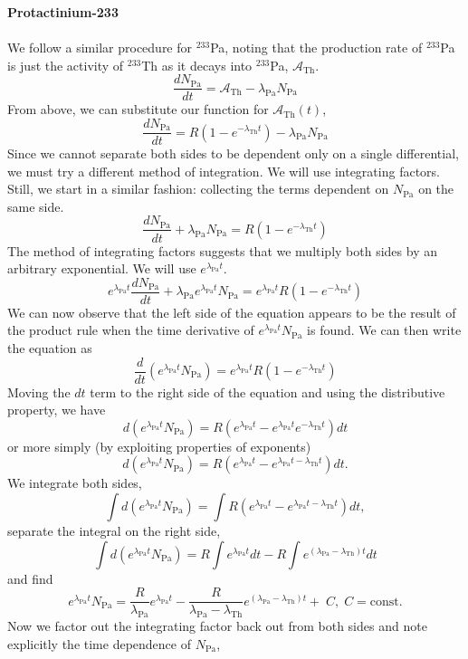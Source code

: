 \documentclass{report}
\begin{document}
\begin{enumerate}[a)]
\textbf{Protactinium-233}\\
\-\\
We follow a similar procedure for $^{233}$Pa, noting that the production rate of $^{233}$Pa is just the activity of $^{233}$Th as it decays into $^{233}$Pa, $\mathcal{A}_{\text{Th}}$.
$$\frac{dN_{\text{Pa}}}{dt} = \mathcal{A}_{\text{Th}} - \lambda_{\text{Pa}}N_{\text{Pa}}$$
From above, we can substitute our function for $\mathcal{A}_{\text{Th}}(t)$,
$$\frac{dN_{\text{Pa}}}{dt} = R(1-e^{-\lambda_{\text{Th}}t}) - \lambda_{\text{Pa}}N_{\text{Pa}}$$
Since we cannot separate both sides to be dependent only on a single differential, we must try a different method of integration. We will use integrating factors. Still, we start in a similar fashion: collecting the terms dependent on $N_{\text{Pa}}$ on the same side.
$$ \frac{dN_{\text{Pa}}}{dt}+\lambda_{\text{Pa}}N_{\text{Pa}} = R(1-e^{-\lambda_{\text{Th}}t}) $$
The method of integrating factors suggests that we multiply both sides by an arbitrary exponential. We will use $e^{\lambda_{\text{Pa}}t}$.
$$ e^{\lambda_{\text{Pa}}t}\frac{dN_{\text{Pa}}}{dt} + \lambda_{\text{Pa}}e^{\lambda_{\text{Pa}}t}N_{\text{Pa}} = e^{\lambda_{\text{Pa}}t}R(1-e^{-\lambda_{\text{Th}}t}) $$
We can now observe that the left side of the equation appears to be the result of the product rule when the time derivative of $e^{\lambda_{\text{Pa}}t}N_{\text{Pa}}$ is found. We can then write the equation as
$$\frac{d}{dt}(e^{\lambda_{\text{Pa}}t}N_{\text{Pa}}) = e^{\lambda_{\text{Pa}}t}R(1-e^{-\lambda_{\text{Th}}t})$$
Moving the $dt$ term to the right side of the equation and using the distributive property, we have
$$ d(e^{\lambda_{\text{Pa}}t}N_{\text{Pa}}) = R(e^{\lambda_{\text{Pa}}t}-e^{\lambda_{\text{Pa}}t}e^{-\lambda_{\text{Th}}t})dt $$
or more simply (by exploiting properties of exponents)
$$ d(e^{\lambda_{\text{Pa}}t}N_{\text{Pa}}) = R(e^{\lambda_{\text{Pa}}t}-e^{\lambda_{\text{Pa}}t-\lambda_{\text{Th}}t})dt .$$
We integrate both sides,
$$ \int{d\left(e^{\lambda_{\text{Pa}}t}N_{\text{Pa}}\right)} = \int{ R(e^{\lambda_{\text{Pa}}t}-e^{\lambda_{\text{Pa}}t-\lambda_{\text{Th}}t})dt}, $$
separate the integral on the right side,
$$ \int{d\left(e^{\lambda_{\text{Pa}}t}N_{\text{Pa}}\right)} = R\int{ e^{\lambda_{\text{Pa}}t}dt}-R\int{e^{(\lambda_{\text{Pa}}-\lambda_{\text{Th}})t}dt} $$
and find
$$e^{\lambda_{\text{Pa}}t}N_{\text{Pa}} = \frac{R}{\lambda_{\text{Pa}}}e^{\lambda_{\text{Pa}}t}-\frac{R}{\lambda_{\text{Pa}}-\lambda_{\text{Th}}}e^{(\lambda_{\text{Pa}}-\lambda_{\text{Th}})t} +\;C,\; C=\text{const.}$$
Now we factor out the integrating factor back out from both sides and note explicitly the time dependence of $N_{\text{Pa}}$,

\end{enumerate}
\end{document}

